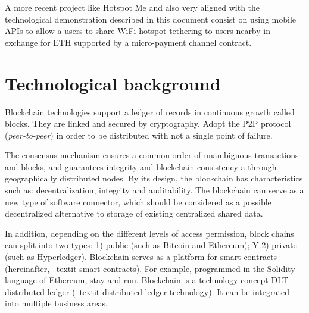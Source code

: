 \documentclass[12pt]{amsart}
\begin{document}
\begin{multicols}{2}
\vspace{0.35cm}

A more recent project like Hotspot Me\cite{hotspotme}
and also very aligned with the technological demonstration
described in this document consist on using mobile
APIs to allow a users to share WiFi hotspot tethering
to users nearby in exchange for ETH supported by a
micro-payment channel contract.


\section{Technological background}\label{ch:bc}

\vspace{0.35cm}

Blockchain technologies support a ledger of records in
continuous growth called blocks.
They are linked and secured by
cryptography. Adopt the P2P protocol
(\textit{peer-to-peer}) in order to be distributed
with not a single point of failure.

\vspace{0.35cm}

The consensus mechanism ensures a common order
of unambiguous transactions and
blocks, and guarantees integrity and
blockchain consistency a
through geographically distributed nodes.
By its design, the blockchain has characteristics
such as: decentralization, integrity and auditability.
The blockchain can serve as a new
type of software connector, which should be considered
as a possible decentralized alternative to storage
of existing centralized shared data.

\vspace{0.35cm}

In addition, depending on the different levels of
access permission, block chains can
split into two types:
1) public (such as Bitcoin and Ethereum); Y
2) private (such as Hyperledger). Blockchain serves
as a platform for smart contracts
(hereinafter, \ textit {smart contracts}).
For example, programmed in the Solidity language of
Ethereum, stay and run.
Blockchain is a technology concept
DLT distributed ledger
(\ textit {distributed ledger technology}).
It can be integrated into multiple business areas.



\end{multicols}
\end{document}

